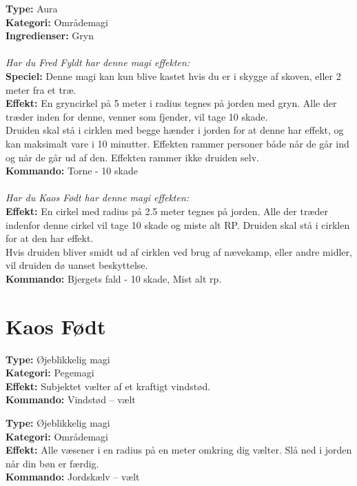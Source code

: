 \begin{nly*}
\textbf{Type:} Aura  \\
\textbf{Kategori:} Områdemagi\\
\textbf{Ingredienser:} Gryn\\
\\
\emph{\textit{Har du Fred Fyldt har denne magi effekten:}}\\
\textbf{Speciel:} Denne magi kan kun blive kastet hvis du er i skygge af skoven, eller 2 meter fra et træ.\\
\textbf{Effekt:} En gryncirkel på 5 meter i radius tegnes på jorden med gryn. Alle der træder inden for denne, venner som fjender, vil tage 10 skade.\\ 
Druiden skal stå i cirklen med begge hænder i jorden for at denne har effekt, og kan maksimalt vare i 10 minutter. Effekten rammer personer både når de går ind og når de går ud af den. Effekten rammer ikke druiden selv.\\
\textbf{Kommando:} Torne - 10 skade\\
\\
\emph{\textit{Har du Kaos Født har denne magi effekten:}}\\
\textbf{Effekt:} En cirkel med radius på 2.5 meter tegnes på jorden. Alle der træder indenfor denne cirkel vil tage 10 skade og miste alt RP. Druiden skal stå i cirklen for at den har effekt. \\
Hvis druiden bliver smidt ud af cirklen ved brug af nævekamp, eller andre midler, vil druiden dø uanset beskyttelse.\\
\textbf{Kommando:} Bjergets fald - 10 skade, Mist alt rp.
\end{nly*}

\newpage
\section{Kaos Født}
\begin{nkaos*}[Vindstød]
\textbf{Type:} Øjeblikkelig magi\\ 
\textbf{Kategori:} Pegemagi\\
\textbf{Effekt:} Subjektet vælter af et kraftigt vindstød.\\
\textbf{Kommando:} Vindstød – vælt
\end{nkaos*}

\begin{nkaos*}[Jordskælv]
\textbf{Type:} Øjeblikkelig magi\\ 
\textbf{Kategori:} Områdemagi\\
\textbf{Effekt:} Alle væsener i en radius på en meter omkring dig vælter. Slå ned i jorden når din bøn er færdig.\\
\textbf{Kommando:} Jordskælv – vælt

\end{nkaos*}

